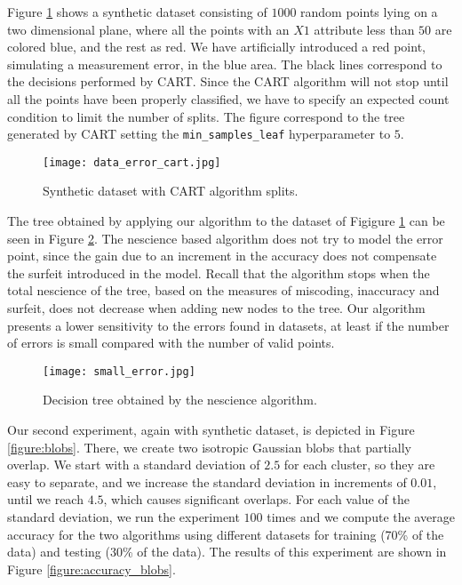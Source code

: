 Figure \ref{figure:data_error_cart} shows a synthetic dataset consisting of $1000$ random points lying on a two dimensional plane, where all the points with an $X1$ attribute less than $50$ are colored blue, and the rest as red. We have artificially introduced a red point, simulating a measurement error, in the blue area. The black lines correspond to the decisions performed by CART. Since the CART algorithm will not stop until all the points have been properly classified, we have to specify an expected count condition to limit the number of splits. The figure correspond to the tree generated by CART setting the \texttt{min\_samples\_leaf} hyperparameter to $5$.

\begin{figure}[h]
\centering
\texttt{[image: data\_error\_cart.jpg]}
\caption{Synthetic dataset with CART algorithm splits.}
\label{figure:data_error_cart}
\end{figure}

The tree obtained by applying our algorithm to the dataset of Figigure \ref{figure:data_error_cart} can be seen in Figure \ref{figure:data_error_nes}. The nescience based algorithm does not try to model the error point, since the gain due to an increment in the accuracy does not compensate the surfeit introduced in the model. Recall that the algorithm stops when the total nescience of the tree, based on the measures of miscoding, inaccuracy and surfeit, does not decrease when adding new nodes to the tree. Our algorithm presents a lower sensitivity to the errors found in datasets, at least if the number of errors is small compared with the number of valid points.

\begin{figure}[h]
\centering
\texttt{[image: small\_error.jpg]}
\caption{Decision tree obtained by the nescience algorithm.}
\label{figure:data_error_nes}
\end{figure}

Our second experiment, again with synthetic dataset, is depicted in Figure \ref{figure:blobs}. There, we create two isotropic Gaussian blobs that partially overlap. We start with a standard deviation of $2.5$ for each cluster, so they are easy to separate, and we increase the standard deviation in increments of $0.01$, until we reach $4.5$, which causes significant overlaps. For each value of the standard deviation, we run the experiment $100$ times and we compute the average accuracy for the two algorithms using different datasets for training (70\% of the data) and testing (30\% of the data). The results of this experiment are shown in Figure \ref{figure:accuracy_blobs}.

